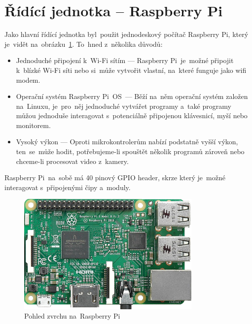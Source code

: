 \section{Řídící jednotka -- Raspberry Pi}
Jako hlavní řídící jednotka byl~použit jednodeskový počítač Raspberry Pi, který je~vidět na~obrázku~\ref{fig:RPi}. To~hned z~několika důvodů:
\begin{itemize}
  \item Jednoduché připojení k~Wi-Fi sítím --- Raspberry Pi~je~možné připojit k~blízké Wi-Fi síti nebo si~může vytvořit vlastní, na~které funguje jako wifi modem.
  \item Operační systém Raspberry Pi~OS~--- Běží na~něm operační systém založen na~Linuxu, je~pro~něj jednoduché vytvářet programy a~také programy můžou jednoduše interagovat s~potenciálně připojenou klávesnicí, myší nebo monitorem.
  \item Vysoký výkon --- Oproti mikrokontrolerům nabízí podstatně vyšší výkon, ten~se~může hodit, potřebujeme-li spouštět několik programů zároveň nebo chceme-li procesovat video z~kamery.
\end{itemize}
Raspberry Pi~na~sobě má 40 pinový GPIO header, skrze který je~možné interagovat s~připojenými čipy a~moduly.

\begin{figure}[htb]
    \centering
  \includegraphics[width=0.8\textwidth]{img/RPi.png}
  \caption{\label{fig:RPi} Pohled zvrchu na~Raspberry Pi~\cite{rpi-image}}
\end{figure}












